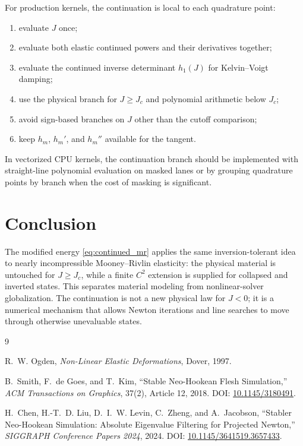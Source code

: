 \documentclass[11pt]{article}
\begin{document}
For production kernels, the continuation is local to each quadrature point:
\begin{enumerate}
  \item evaluate $J$ once;
  \item evaluate both elastic continued powers and their derivatives together;
  \item evaluate the continued inverse determinant $h_1(J)$ for
        Kelvin--Voigt damping;
  \item use the physical branch for $J\ge J_c$ and polynomial arithmetic below
        $J_c$;
  \item avoid sign-based branches on $J$ other than the cutoff comparison;
  \item keep $h_m$, $h_m'$, and $h_m''$ available for the tangent.
\end{enumerate}
In vectorized CPU kernels, the continuation branch should be implemented with
straight-line polynomial evaluation on masked lanes or by grouping quadrature
points by branch when the cost of masking is significant.

\section{Conclusion}

The modified energy \eqref{eq:continued_mr} applies the same
inversion-tolerant idea to nearly incompressible Mooney--Rivlin elasticity:
the physical material is untouched for $J\ge J_c$, while a finite $C^2$
extension is supplied for collapsed and inverted states. This separates
material modeling from nonlinear-solver globalization. The continuation is
not a new physical law for $J<0$; it is a numerical mechanism that allows
Newton iterations and line searches to move through otherwise unevaluable
states.

\begin{thebibliography}{9}

R.~W. Ogden,
\newblock \emph{Non-Linear Elastic Deformations},
\newblock Dover, 1997.

B.~Smith, F.~de Goes, and T.~Kim,
\newblock ``Stable Neo-Hookean Flesh Simulation,''
\newblock \emph{ACM Transactions on Graphics}, 37(2), Article 12, 2018.
\newblock DOI: \href{https://doi.org/10.1145/3180491}{10.1145/3180491}.

H.~Chen, H.-T.~D. Liu, D.~I.~W. Levin, C.~Zheng, and A.~Jacobson,
\newblock ``Stabler Neo-Hookean Simulation: Absolute Eigenvalue Filtering for
Projected Newton,''
\newblock \emph{SIGGRAPH Conference Papers 2024}, 2024.
\newblock DOI: \href{https://doi.org/10.1145/3641519.3657433}
{10.1145/3641519.3657433}.

\end{thebibliography}
\end{document}
